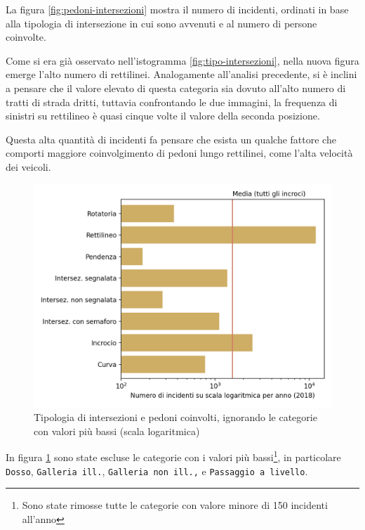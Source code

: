 \documentclass[a4paper]{report}
\newcommand{\columnstyle}[1]{\texttt{#1}}
\begin{document}
La figura \ref{fig:pedoni-intersezioni} mostra il numero di incidenti, 
ordinati in base alla tipologia di intersezione in cui sono avvenuti 
e al numero di persone coinvolte. 

Come si era già osservato nell'istogramma \ref{fig:tipo-intersezioni}, nella nuova 
figura emerge l'alto numero di rettilinei. 
Analogamente all'analisi precedente, si è inclini a pensare che il valore 
elevato di questa categoria sia dovuto all'alto 
numero di tratti di strada dritti, tuttavia confrontando le due immagini, 
la frequenza di sinistri su rettilineo è quasi cinque 
volte il valore della seconda posizione. 

Questa alta quantità di incidenti fa pensare che esista un qualche fattore 
che comporti maggiore coinvolgimento di pedoni lungo rettilinei, come 
l'alta velocità dei veicoli. 

\begin{figure}
    \includegraphics[width=\linewidth]{../src/incidenti/incidenti_senza_coords/pedoni/pedoni_log.png}
    \caption{Tipologia di intersezioni e pedoni coinvolti, ignorando le categorie con valori più bassi (scala logaritmica)}
    \label{fig:pedoni-no-rett}
\end{figure}

In figura \ref{fig:pedoni-no-rett} sono state 
escluse le categorie con i valori 
più bassi\footnote{Sono state rimosse tutte le categorie con valore minore di 
150 incidenti all'anno}, 
in particolare \columnstyle{Dosso}, \columnstyle{Galleria ill.}, 
\columnstyle{Galleria non ill.,} e \columnstyle{Passaggio a livello}. 
\end{document}
